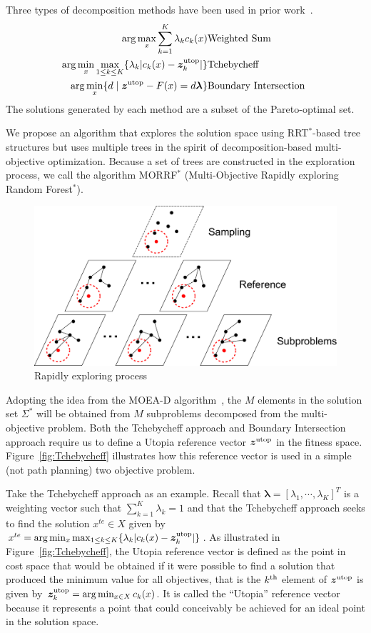 \documentclass[phd]{byuprop}
\begin{document}
Three types of decomposition methods have been used in prior work~\cite{Zhang2007}.
\begin{eqnarray}
\arg\max_x \sum_{k=1}^{K} \lambda_{k} c_{k} (x) & {\rm Weighted \ Sum} \label{eq:weighted}\\
\arg\min_x\max_{1 \leq k \leq K}  \{ \lambda_{k} | c_{k}(x) - \bm{z}^{\rm utop}_{k}  | \} & {\rm Tchebycheff} \label{eq:Tchebycheff}\\
\arg\min_x \{ d \mid \bm{z}^{\rm utop} - F(x) = d \bm{\lambda} \} & {\rm Boundary \ Intersection \ } \label{eq:boundary}
\end{eqnarray}
The solutions generated by each method are a subset of the Pareto-optimal set.

We propose an algorithm that explores the solution space using RRT$^{*}$-based tree structures but uses multiple trees in the spirit of decomposition-based multi-objective optimization.
Because a set of trees are constructed in the exploration process, we call the algorithm MORRF$^{*}$ (Multi-Objective Rapidly exploring Random Forest$^{*}$).

\begin{figure}
	\centering
	\includegraphics[width=0.55\linewidth]{./fig/MORRTstar}
	\caption{Rapidly exploring process}
	\label{fig:MORRTstar}
\end{figure}

Adopting the idea from the MOEA-D algorithm~\cite{Zhang2007}, the $M$ elements in the solution set $\Sigma^{*}$ will be obtained from $ M $ subproblems decomposed from the multi-objective problem. 
Both the Tchebycheff approach and Boundary Intersection approach require us to define a Utopia reference vector $ \bm{z}^{\rm utop} $ in the fitness space. 
Figure~\ref{fig:Tchebycheff} illustrates how this reference vector is used in a simple (not path planning) two objective problem.  

Take the Tchebycheff approach as an example.
Recall that  $ \bm{\lambda} = [ \lambda_{1} , \cdots , \lambda_{K}  ]^{T} $ is a weighting vector such that $ \sum_{k=1}^{K} \lambda_{k} = 1 $ and that the Tchebycheff approach seeks to find the solution $ x^{te}\in X $ given by $ x^{te} = \arg\min_x \max_{1 \leq k \leq K}  \{ \lambda_{k} | c_{k}(x) - \bm{z}^{\rm utop}_{k}  | \} $.  
As illustrated in Figure~\ref{fig:Tchebycheff}, the Utopia reference vector is defined as the point in cost space that would be obtained if it were possible to find a solution that produced the minimum value for all objectives, that is the $k^{\rm th}$ element of $\bm{z}^{\rm utop}$ is given by $\bm{z}^{\rm utop}_{k} = \arg \min_{x \in X} c_{k}(x)$.  
It is called the ``Utopia'' reference vector because it represents a point that could conceivably be achieved for an ideal point in the solution space.
\end{document}

